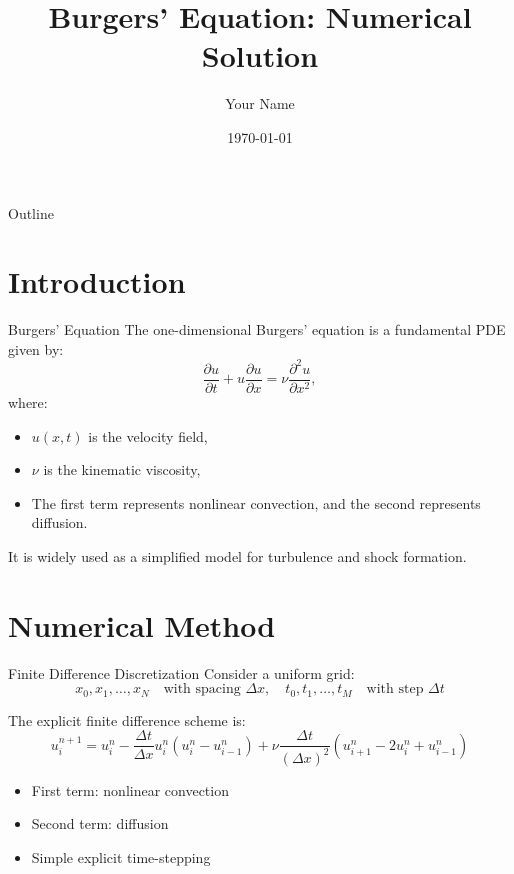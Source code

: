 \documentclass{beamer}
\title{Burgers' Equation: Numerical Solution}
\author{Your Name}
\date{\today}
\begin{document}
\begin{frame}
\titlepage
\end{frame}

\begin{frame}{Outline}
\tableofcontents
\end{frame}

\section{Introduction}
\begin{frame}{Burgers' Equation}
The one-dimensional Burgers' equation is a fundamental PDE given by:
\[
\frac{\partial u}{\partial t} + u \frac{\partial u}{\partial x} = \nu \frac{\partial^2 u}{\partial x^2},
\]
where:
\begin{itemize}
    \item $u(x,t)$ is the velocity field,
    \item $\nu$ is the kinematic viscosity,
    \item The first term represents nonlinear convection, and the second represents diffusion.
\end{itemize}
It is widely used as a simplified model for turbulence and shock formation.
\end{frame}

\section{Numerical Method}
\begin{frame}{Finite Difference Discretization}
Consider a uniform grid:
\[
x_0, x_1, \dots, x_N \quad \text{with spacing } \Delta x, \quad
t_0, t_1, \dots, t_M \quad \text{with step } \Delta t
\]

The explicit finite difference scheme is:
\[
u_i^{n+1} = u_i^n - \frac{\Delta t}{\Delta x} u_i^n (u_i^n - u_{i-1}^n) 
+ \nu \frac{\Delta t}{(\Delta x)^2} (u_{i+1}^n - 2 u_i^n + u_{i-1}^n)
\]

\begin{itemize}
    \item First term: nonlinear convection
    \item Second term: diffusion
    \item Simple explicit time-stepping
\end{itemize}
\end{frame}

\end{document}
